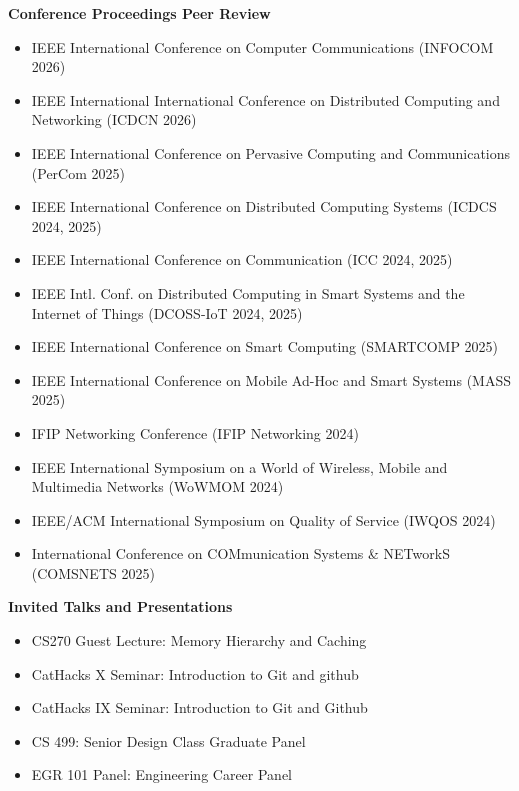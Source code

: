 \documentclass[a4paper,12pt]{article}
\begin{document}
\textbf{Conference Proceedings Peer Review}
\begin{itemize}[nosep,after=\strut, leftmargin=1em, itemsep=3pt,label=--]
\item IEEE International Conference on Computer Communications (INFOCOM 2026)
\item IEEE International International Conference on Distributed Computing and Networking (ICDCN 2026)
\item IEEE International Conference on Pervasive Computing and Communications (PerCom 2025)
\item IEEE International Conference on Distributed Computing Systems (ICDCS 2024, 2025)
\item IEEE International Conference on Communication (ICC 2024, 2025)
\item IEEE Intl. Conf. on Distributed Computing in Smart Systems and the Internet of Things (DCOSS-IoT 2024, 2025)
\item IEEE International Conference on Smart Computing (SMARTCOMP 2025)
\item IEEE International Conference on Mobile Ad-Hoc and Smart Systems (MASS 2025)
\item IFIP Networking Conference (IFIP Networking 2024)
\item IEEE International Symposium on a World of Wireless, Mobile and Multimedia Networks (WoWMOM 2024)
\item IEEE/ACM International Symposium on Quality of Service (IWQOS 2024)
\item International Conference on COMmunication Systems \& NETworkS (COMSNETS 2025)
\end{itemize}

\textbf{Invited Talks and Presentations}
\begin{itemize}[nosep,after=\strut, leftmargin=1em, itemsep=3pt,label=--]
\item CS270 Guest Lecture: Memory Hierarchy and Caching
\item CatHacks X Seminar: Introduction to Git and github
\item CatHacks IX Seminar: Introduction to Git and Github
\item CS 499: Senior Design Class Graduate Panel
\item EGR 101 Panel: Engineering Career Panel
\end{itemize}


\end{document}
